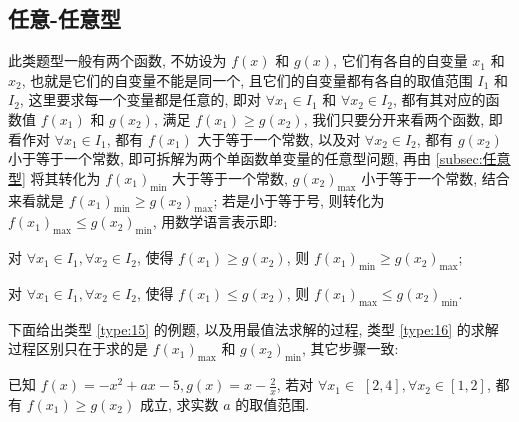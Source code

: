 \subsection{任意-任意型}\label{subsec:2.4任意-任意型}
此类题型一般有两个函数, 不妨设为 \(f(x)\) 和 \(g(x)\), 它们有各自的自变量 \({x}_{1}\) 和 \({x}_{2}\), 也就是它们的自变量不能是同一个, 且它们的自变量都有各自的取值范围 \({I}_{1}\) 和 \({I}_{2}\), 这里要求每一个变量都是任意的, 即对 \(\forall {x}_{1} \in  {I}_{1}\) 和 \(\forall {x}_{2} \in  {I}_{2}\), 都有其对应的函数值 \(f\left( {x}_{1}\right)\) 和 \(g\left( {x}_{2}\right)\), 满足 \(f\left( {x}_{1}\right)  \geq  g\left( {x}_{2}\right)\), 我们只要分开来看两个函数, 即看作对 \(\forall {x}_{1} \in  {I}_{1}\), 都有 \(f\left( {x}_{1}\right)\) 大于等于一个常数, 以及对 \(\forall {x}_{2} \in  {I}_{2}\), 都有 \(g\left( {x}_{2}\right)\) 小于等于一个常数, 即可拆解为两个单函数单变量的任意型问题, 再由 \ref{subsec:任意型} 将其转化为 \(f{\left( {x}_{1}\right) }_{\min }\) 大于等于一个常数, \(g{\left( {x}_{2}\right) }_{\max }\) 小于等于一个常数, 结合来看就是 \(f{\left( {x}_{1}\right) }_{\min } \geq  g{\left( {x}_{2}\right) }_{\max }\); 若是小于等于号, 则转化为 \(f{\left( {x}_{1}\right) }_{\max } \leq  g{\left( {x}_{2}\right) }_{\min }\), 用数学语言表示即:

\begin{type}\label{type:15}
  对 \(\forall {x}_{1} \in  {I}_{1}, \forall {x}_{2} \in  {I}_{2}\), 使得 \(f\left( {x}_{1}\right)  \geq  g\left( {x}_{2}\right)\), 则 \(f{\left( {x}_{1}\right) }_{\min } \geq  g{\left( {x}_{2}\right) }_{\max }\);
\end{type}

\begin{type}\label{type:16}
  对 \(\forall {x}_{1} \in  {I}_{1}, \forall {x}_{2} \in  {I}_{2}\), 使得 \(f\left( {x}_{1}\right)  \leq  g\left( {x}_{2}\right)\), 则 \(f{\left( {x}_{1}\right) }_{\max } \leq  g{\left( {x}_{2}\right) }_{\min }\). 
\end{type}

下面给出类型 \ref{type:15} 的例题, 以及用最值法求解的过程, 类型 \ref{type:16} 的求解过程区别只在于求的是 \(f{\left( {x}_{1}\right) }_{\max }\) 和 \(g{\left( {x}_{2}\right) }_{\min }\), 其它步骤一致:


\begin{variation}\label{variation:2.1.9}
  已知 \(f(x)  =  -{x}^{2} + {ax} -5, g(x)  = x -\frac{2}{x}\), 若对 \(\forall {x}_{1} \in\)  \(\left\lbrack  {2, 4}\right\rbrack  , \forall {x}_{2} \in  \left\lbrack  {1, 2}\right\rbrack\), 都有 \(f\left( {x}_{1}\right)  \geq  g\left( {x}_{2}\right)\) 成立, 求实数 \(a\) 的取值范围.
\end{variation}

